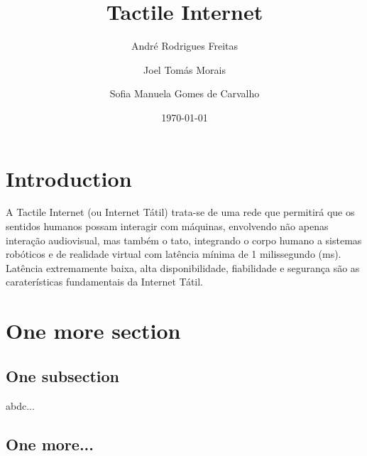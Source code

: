 \documentclass{llncs}
\begin{document}
\mainmatter
\title{Tactile Internet}


\author{André Rodrigues Freitas \and Joel Tomás Morais \and Sofia Manuela Gomes de Carvalho}



\date{\today}





\maketitle

\newpage
\begin{abstract}

\end{abstract}

\section{Introduction}

 A Tactile Internet (ou Internet Tátil) trata-se de uma rede que permitirá que os sentidos humanos possam interagir com máquinas, envolvendo não apenas interação audiovisual, mas também o tato, integrando o corpo humano a sistemas robóticos e de realidade virtual com latência mínima de 1 milissegundo (ms).
 Latência extremamente baixa, alta disponibilidade, fiabilidade e segurança são as caraterísticas fundamentais da Internet Tátil.

\section{One more section}

\subsection{One subsection}
abdc...
\subsection{One more...}

\end{document}

